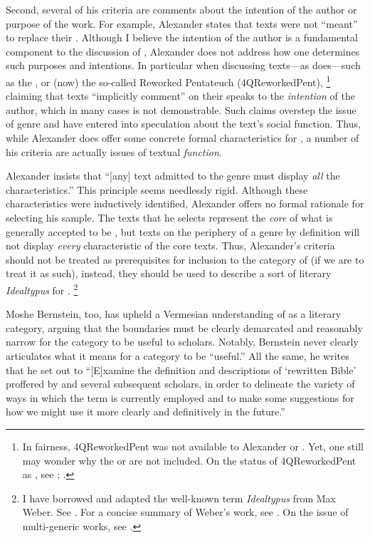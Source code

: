 Second, several of his criteria are comments about the intention of the author or purpose of the work. For example, Alexander states that \rwb texts were not ``meant'' to replace their \vorlagen. Although I believe the intention of the author is a fundamental component to the discussion of \rwb, Alexander does not address how one determines such purposes and intentions.  In particular when discussing texts---as \vermes does---such as the \pTarg, or (now) the so-called Reworked Pentateuch (4QReworkedPent),%
    \footnote{%
        In fairness, 4QReworkedPent was not available to Alexander or \vermes. Yet, one still may wonder why   the \lxx or \sampent are not included. On the status of 4QReworkedPent as \rwb, see 
        \cite{zahn2011}; 
        \cite{zahn_dsd2008}.}
claiming that \rwb texts ``implicitly comment'' on their \vorlagen speaks to the \emph{intention} of the author, which in many cases is not demonstrable. Such claims overstep the issue of genre and have entered into speculation about the text's social function. Thus, while Alexander does offer some concrete formal characteristics for \rwb, a number of his criteria are actually issues of textual \emph{function}.

Alexander insists that ``[any] text admitted to the genre must display \emph{all} the characteristics.''%
    \autocite[119 n. 11]{alexander_carson-williamson1988}
This principle seems needlessly rigid. Although these characteristics were inductively identified,  Alexander offers no formal rationale for selecting his sample. The texts that he selects represent the \emph{core} of what is generally accepted to be \rwb, but texts on the periphery of a genre by definition will not display \emph{every} characteristic of the core texts. Thus, Alexander's criteria should not be treated as prerequisites for inclusion to the category of \rwb (if we are to treat it as such), instead, they should be used to describe a sort of literary \emph{Idealtypus} for \rwb.%
    \footnote{%
        I have borrowed and adapted the well-known term \emph{Idealtypus} from Max Weber. See 
        \cite{weber1978}. For a concise summary of Weber's work, see 
        \cite[12--16]{smith-riley2009}. On the issue of multi-generic works, see \cite{fraade_goldstein-etal2017}.}

Moshe Bernstein, too, has upheld a Vermesian understanding of \rwb as a literary category, arguing that the boundaries must be clearly demarcated and reasonably narrow for the category to be useful to scholars.%
    \autocite{bernstein_textus2005}
Notably, Bernstein never clearly articulates what it means for a category to be ``useful.'' All the same, he writes that he set out to ``[E]xamine the definition and descriptions of `rewritten Bible' proffered by \vermes and several subsequent scholars, in order to delineate the variety of ways in which the term is currently employed and to make some suggestions for how we might use it more clearly and definitively in the future.''%
    \autocite[171--172]{bernstein_textus2005}

